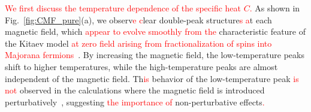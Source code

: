 \documentclass[twocolumn,superscriptaddress,showpacs, longbibliography, aps, prb]{revtex4-2}
\newcommand{\red}[1]{\textcolor{red}{#1}}
\newcommand{\blue}[1]{\textcolor{blue}{#1}}
\newcommand{\orange}[1]{\textcolor{orange}{#1}}
\begin{document}
\red{We first discuss the temperature dependence of the specific heat $C$.} 
As shown in Fig.~\ref{fig:CMF_pure}(a),
we %
observ\red{e %
c}lear double-peak structure\red{s %
a}t each magnetic field, which %
\red{appear to evolve smoothly from the} 
characteristic %
feature of the Kitaev model \red{at zero field arising from fractionalization of spins into Majorana fermions}~\cite{NasuUM2014,NasuUM2015}.
By increasing the magnetic field, %
the low-temperature peaks %
shift to higher temperatures, while the high-temperature peaks are almost independent of the magnetic field. 
Th\red{is} %
behavior of the low-temperature peak %
\red{is not} %
observed in the calculations where the magnetic field is introduced perturbatively~\cite{NasuYM2017}, suggesting %
\red{the importance of} non-perturbative effects\red{.} %

\end{document}
